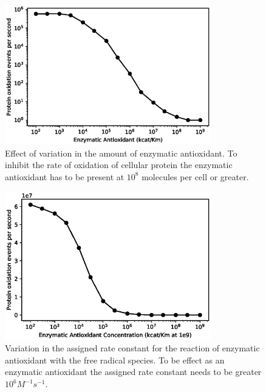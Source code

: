 \documentclass[preprint,12pt,authoryear]{elsarticle}
\begin{document}
\begin{figure}
\begin{center}
\includegraphics[width=0.8\textwidth]{Fig2A.eps}
\end{center}
\caption{\label{fig:g2a} 
Effect of variation in the amount of enzymatic antioxidant.
To inhibit the rate of oxidation of cellular protein the enzymatic antioxidant has to be present at 
$10^8$ molecules per cell or greater.
}
\end{figure}

\begin{figure}
\begin{center}
\includegraphics[width=0.8\textwidth]{Fig2B.eps}
\end{center}
\caption{\label{fig:g2b} Variation in the assigned rate constant for the reaction of enzymatic antioxidant with the free radical species.
To be effect as an enzymatic antioxidant the assigned rate constant needs to be greater $10^6 M^{-1} s^{-1}$.}
\end{figure}
\end{document}
